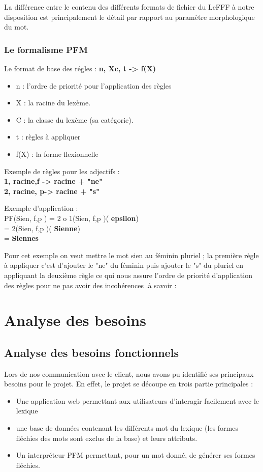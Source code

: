 \documentclass[12pt,a4paper]{article}
\begin{document}
La différence entre le contenu des différents formats de fichier du LeFFF à notre disposition est principalement le détail par rapport au paramètre morphologique du mot.
\subsubsection{Le formalisme PFM  }
      Le format de base des régles : \textbf{n, Xc, t -> f(X) } \\
\begin{itemize}
    \item n : l’ordre de priorité pour l’application des règles
    \item X : la racine du lexème.
    \item C : la classe du lexème (sa catégorie).
    \item t : règles à appliquer
    \item f(X) : la forme flexionnelle
\end{itemize}

Exemple de règles pour les adjectifs : \\
\textbf{1, racine,{f} -> racine + "ne"} \\
\textbf{2, racine, {p}-> racine + "s"}

Exemple d'application : \\
PF(Sien, {f,p} ) = 2 o 1(Sien, {f,p} )(\textbf{ epsilon}) \\
                 = 2(Sien, {f,p} )(\textbf{ Sienne}) \\
                 =\textbf{ Siennes }

Pour cet exemple on veut mettre le mot sien au féminin pluriel ; la première règle à appliquer c'est d'ajouter le "ne" du féminin puis ajouter le "s" du pluriel en appliquant la deuxième règle ce qui nous assure l'ordre de priorité d'application des règles pour ne pas avoir des incohérences .à savoir \cite{PFM} :

\section{Analyse des besoins}
\subsection{Analyse des besoins fonctionnels}
\smallbreak Lors de nos communication avec le client, nous avons pu identifié ses principaux besoins pour le projet. En effet, le projet se découpe en trois partie principales : 
\begin{itemize}  
  \item Une application web permettant aux utilisateurs d'interagir facilement avec le lexique
  \item une base de données contenant les différents mot du lexique (les formes fléchies des mots sont exclus de la base) et leurs attributs.
  \item Un interpréteur PFM permettant, pour un mot donné, de générer ses formes fléchies.
\end{itemize}
\end{document}
